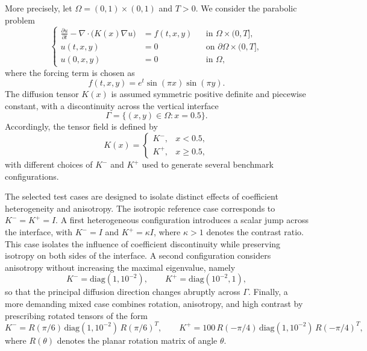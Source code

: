 \documentclass{article}
\begin{document}
More precisely, let $\Omega=(0,1)\times(0,1)$ and $T>0$. We consider the parabolic problem
\begin{equation}
    \nonumber
    \left\{
    \begin{aligned}
        \frac{\partial u}{\partial t} - \nabla\cdot\bigl(K(x)\nabla u\bigr) &= f(t,x,y) && \text{in } \Omega \times (0,T],\\
        u(t,x,y) &= 0 && \text{on } \partial\Omega \times (0,T],\\
        u(0,x,y) &= 0 && \text{in } \Omega,
    \end{aligned}
    \right.
\end{equation}
where the forcing term is chosen as
\begin{equation}
    \nonumber
    f(t,x,y)=e^t\sin(\pi x)\sin(\pi y).
\end{equation}
The diffusion tensor $K(x)$ is assumed symmetric positive definite and piecewise constant, with a discontinuity across the vertical interface
\begin{equation}
    \nonumber
    \Gamma = \{(x,y)\in\Omega : x = 0.5\}.
\end{equation}
Accordingly, the tensor field is defined by
\begin{equation}
    \nonumber
    K(x)=
    \begin{cases}
        K^{-}, & x<0.5,\\[2pt]
        K^{+}, & x\geq 0.5,
    \end{cases}
\end{equation}
with different choices of $K^{-}$ and $K^{+}$ used to generate several benchmark configurations.

The selected test cases are designed to isolate distinct effects of coefficient heterogeneity and anisotropy. The isotropic reference case corresponds to $K^{-}=K^{+}=I$. A first heterogeneous configuration introduces a scalar jump across the interface, with $K^{-}=I$ and $K^{+}=\kappa I$, where $\kappa>1$ denotes the contrast ratio. This case isolates the influence of coefficient discontinuity while preserving isotropy on both sides of the interface. A second configuration considers anisotropy without increasing the maximal eigenvalue, namely
\begin{equation}
    \nonumber
    K^{-}=\mathrm{diag}(1,10^{-2}),
    \qquad
    K^{+}=\mathrm{diag}(10^{-2},1),
\end{equation}
so that the principal diffusion direction changes abruptly across $\Gamma$. Finally, a more demanding mixed case combines rotation, anisotropy, and high contrast by prescribing rotated tensors of the form
\begin{equation}
    \nonumber
    K^{-}=R(\pi/6)\,\mathrm{diag}(1,10^{-2})\,R(\pi/6)^T,
    \qquad
    K^{+}=100\,R(-\pi/4)\,\mathrm{diag}(1,10^{-2})\,R(-\pi/4)^T,
\end{equation}
where $R(\theta)$ denotes the planar rotation matrix of angle $\theta$.
\end{document}
